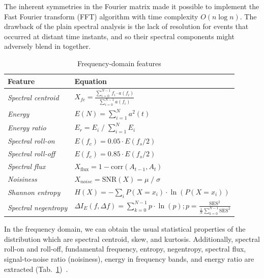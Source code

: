 The inherent symmetries in the Fourier matrix made it possible to implement the Fast Fourier transform (FFT) algorithm with time complexity $O(n \log n)$. The drawback of the plain spectral analysis is the lack of resolution for events that occurred at distant time instants, and so their spectral components might adversely blend in together.

\begin{table}[ht]
\renewcommand{\arraystretch}{2}
\centering
\begin{tabular}{|l|l|}
\hline
\textbf{Feature}           & \textbf{Equation}                                                                                                  \\ \hline
\textit{Spectral centroid} & $ X_{fc} = \frac{\sum_{i = 0}^{N - 1}{f_i \cdot a(f_i)}}{\sum_{i = 0}^{N - 1}{a(f_i)}}$                   \\ \hline
\textit{Energy}            & $ E(N) = \sum_{i = 1}^{N} a^2(t) $                                                                    \\ \hline \textit{Energy ratio}                & $E_r = E_i \;/\; \sum_{i = 1}^{N}{E_i} $                                                        \\ \hline
\textit{Spectral roll-on} & $ E(f_c) = 0.05 \cdot E(f_s / 2) $ \\ \hline
\textit{Spectral roll-off} & $ E(f_c) = 0.85 \cdot E(f_s / 2) $                                                   \\ \hline
\textit{Spectral flux}     & $X_{\mathrm{flux}} = 1 - \mathrm{corr}(A_{t-1}, A_t)$ \\ \hline
\textit{Noisiness}                   & $X_{noise} = \mathrm{SNR}(X) = \mu \;/\; \sigma $                             \\ \hline
\textit{Shannon entropy}      & $H(X) = - \sum_{i} P(X = x_i) \cdot \ln(P(X = x_i)) $                                                  \\ \hline
\textit{Spectral negentropy}      & $\Delta I_E(f, \Delta f) = \sum_{k = 0}^{N - 1}{p \cdot \ln(p); p = \frac{\mathrm{SES}^2}{\frac{1}{N} \sum_{k=0}^{N-1} \mathrm{SES}^2}}$                                                \\ \hline
\end{tabular}
\caption{Frequency-domain features}
\label{tab:fd-features}
\end{table}

In the frequency domain, we can obtain the usual statistical properties of the distribution which are spectral centroid, skew, and kurtosis. Additionally, spectral roll-on and roll-off, fundamental frequency, entropy, negentropy, spectral flux, signal-to-noise ratio (noisiness), energy in frequency bands, and energy ratio are extracted (Tab.~\ref{tab:fd-features})~\cite{peeters_large_2004}.

